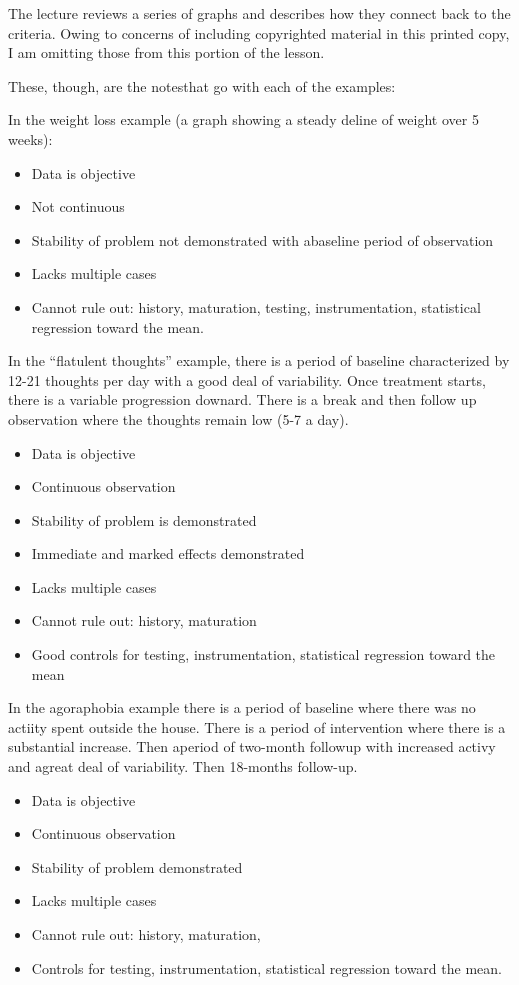 \documentclass[
  english,
]{book}
\providecommand{\tightlist}{%
  \setlength{\itemsep}{0pt}\setlength{\parskip}{0pt}}
\begin{document}
The lecture reviews a series of graphs and describes how they connect back to the criteria. Owing to concerns of including copyrighted material in this printed copy, I am omitting those from this portion of the lesson.

These, though, are the notesthat go with each of the examples:

In the weight loss example (a graph showing a steady deline of weight over 5 weeks):

\begin{itemize}
\tightlist
\item
  Data is objective
\item
  Not continuous
\item
  Stability of problem not demonstrated with abaseline period of observation
\item
  Lacks multiple cases
\item
  Cannot rule out: history, maturation, testing, instrumentation, statistical regression toward the mean.
\end{itemize}

In the ``flatulent thoughts'' example, there is a period of baseline characterized by 12-21 thoughts per day with a good deal of variability. Once treatment starts, there is a variable progression downard. There is a break and then follow up observation where the thoughts remain low (5-7 a day).

\begin{itemize}
\tightlist
\item
  Data is objective
\item
  Continuous observation
\item
  Stability of problem is demonstrated
\item
  Immediate and marked effects demonstrated
\item
  Lacks multiple cases
\item
  Cannot rule out: history, maturation
\item
  Good controls for testing, instrumentation, statistical regression toward the mean
\end{itemize}

In the agoraphobia example there is a period of baseline where there was no actiity spent outside the house. There is a period of intervention where there is a substantial increase. Then aperiod of two-month followup with increased activy and agreat deal of variability. Then 18-months follow-up.

\begin{itemize}
\tightlist
\item
  Data is objective
\item
  Continuous observation
\item
  Stability of problem demonstrated
\item
  Lacks multiple cases
\item
  Cannot rule out: history, maturation,
\item
  Controls for testing, instrumentation, statistical regression toward the mean.
\end{itemize}
\end{document}
